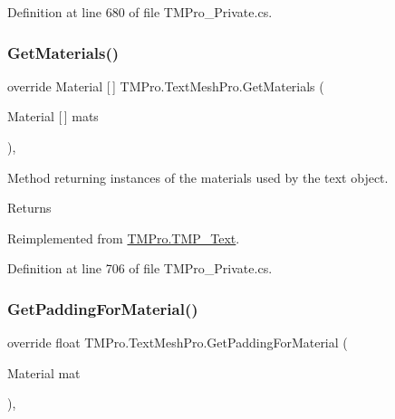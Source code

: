 Definition at line 680 of file T\+M\+Pro\+\_\+\+Private.\+cs.

\mbox{\label{class_t_m_pro_1_1_text_mesh_pro_acbc561637c8727b420c808139960a68c}} 
\subsubsection{\texorpdfstring{GetMaterials()}{GetMaterials()}}
{\footnotesize\ttfamily override Material \mbox{[}$\,$\mbox{]} T\+M\+Pro.\+Text\+Mesh\+Pro.\+Get\+Materials (\begin{DoxyParamCaption}\item[{Material \mbox{[}$\,$\mbox{]}}]{mats }\end{DoxyParamCaption})\hspace{0.3cm}{\ttfamily [protected]}, {\ttfamily [virtual]}}



Method returning instances of the materials used by the text object. 

\begin{DoxyReturn}{Returns}

\end{DoxyReturn}


Reimplemented from \mbox{\hyperlink{class_t_m_pro_1_1_t_m_p___text_a1979f92c718db50761d2773c9c724e81}{T\+M\+Pro.\+T\+M\+P\+\_\+\+Text}}.



Definition at line 706 of file T\+M\+Pro\+\_\+\+Private.\+cs.

\mbox{\label{class_t_m_pro_1_1_text_mesh_pro_ad427fd2cbd79c9304efac4b9a496a234}} 
\subsubsection{\texorpdfstring{GetPaddingForMaterial()}{GetPaddingForMaterial()}\hspace{0.1cm}{\footnotesize\ttfamily [1/2]}}
{\footnotesize\ttfamily override float T\+M\+Pro.\+Text\+Mesh\+Pro.\+Get\+Padding\+For\+Material (\begin{DoxyParamCaption}\item[{Material}]{mat }\end{DoxyParamCaption})\hspace{0.3cm}{\ttfamily [protected]}, {\ttfamily [virtual]}}



